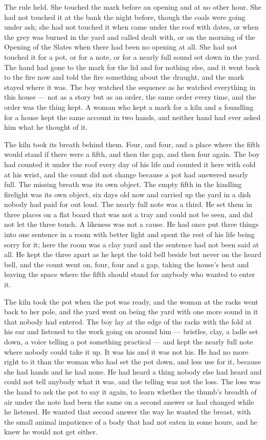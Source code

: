 The rule held. She touched the mark before an opening and at no other hour. She had not touched it at the bank the night before, though the coals were going under ash; she had not touched it when  came under the roof with dates, or when the grey was burned in the yard and called dealt with, or on the morning of the Opening of the Slates when there had been no opening at all. She had not touched it for a pot, or for a note, or for a nearly full sound set down in the yard. The hand had gone to the mark for the lid and for nothing else, and it went back to the fire now and told the fire something about the draught, and the mark stayed where it was. The boy watched the sequence as he watched everything in this house --- not as a story but as an order, the same order every time, and the order was the thing kept. A woman who kept a mark for a kiln and a foundling for a house kept the same account in two hands, and neither hand had ever asked him what he thought of it.

The kiln took its breath behind them. Four, and four, and a place where the fifth would stand if there were a fifth, and then the gap, and then four again. The boy had counted it under the roof every day of his life and counted it here with cold at his wrist, and the count did not change because a pot had answered nearly full. The missing breath was its own object. The empty fifth in the kindling firelight was its own object, six days old now and carried up the yard in a dish nobody had paid for out loud. The nearly full note was a third. He set them in three places on a flat board that was not a tray and could not be seen, and did not let the three touch. A likeness was not a cause. He had once put three things into one sentence in a room with better light and spent the rest of his life being sorry for it; here the room was a clay yard and the sentence had not been said at all. He kept the three apart as he kept the told bell beside but never on the heard bell, and the count went on, four, four and a gap, taking the house's heat and leaving the space where the fifth should stand for anybody who wanted to enter it.

\scenebreak

The kiln took the pot when the pot was ready, and the woman at the racks went back to her pole, and the yard went on being the yard with one more sound in it that nobody had entered. The boy lay at the edge of the racks with the fold at his ear and listened to the work going on around him --- bristles, clay, a ladle set down, a voice telling a pot something practical --- and kept the nearly full note where nobody could take it up. It was his and it was not his. He had no more right to it than the woman who had set the pot down, and less use for it, because she had hands and he had none. He had heard a thing nobody else had heard and could not tell anybody what it was, and the telling was not the loss. The loss was the hand to ask the pot to say it again, to learn whether the thumb's breadth of air under the note had been the same on a second answer or had changed while he listened. He wanted that second answer the way he wanted the breast, with the small animal impatience of a body that had not eaten in some hours, and he knew he would not get either.

